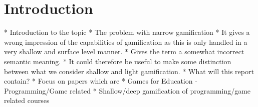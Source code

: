 \section{Introduction}
* Introduction to the topic
* The problem with narrow gamification
    * It gives a wrong impression of the capabilities of gamification as this is only handled in a very shallow and surface level manner. 
    * Gives the term a somewhat incorrect semantic meaning. 
    * It could therefore be useful to make some distinction between what we consider shallow and light gamification. 
* What will this report contain?
    * Focus on papers which are
        * Games for Education - Programming/Game related
            * Shallow/deep gamification of programming/game related courses